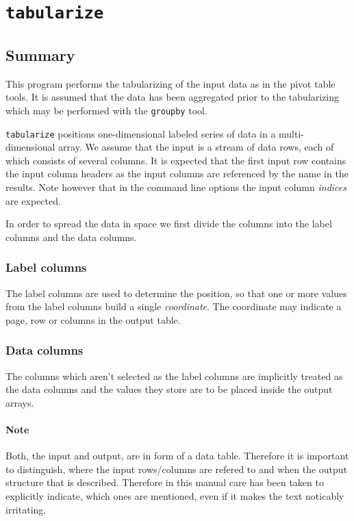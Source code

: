 \documentclass{report}
\begin{document}
\section{\texttt{tabularize}}

\subsection{Summary}
This program performs the tabularizing of the input data as in the pivot table
tools. It is assumed that the data has been aggregated prior to the tabularizing
which may be performed with the \texttt{groupby} tool.

\texttt{tabularize} positions one-dimensional labeled series of data in a
multi-dimensional array. We assume that the input is a stream of data rows,
each of which consists of several columns. It is expected that the first input 
row contains the input column headers as the input columns are referenced by the
name in the results. Note however that in the command line options the input
column \textit{indices} are expected.

In order to spread the data in space we first divide the columns into the
label columns and the data columns.

\subsubsection{Label columns}
The label columns are used to determine the position, so that one or more values
from the label columns build a single \textit{coordinate}. The coordinate may
indicate a page, row or columns in the output table.

\subsubsection{Data columns}
The columns which aren't selected as the label columns are implicitly treated as
the data columns and the values they store are to be placed inside the output
arrays.

\paragraph{Note}
Both, the input and output, are in form of a data table. Therefore it is important
to distinguish, where the input rows/columns are refered to and when the output
structure that is described. Therefore in this manual care has been taken 
to explicitly indicate, which ones are mentioned, even if it makes the text
noticably irritating.
\end{document}
